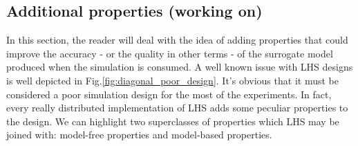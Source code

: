 \documentclass[12pt]{article}
\newcommand{\mfigref}[1]{Fig.\ref{#1}}
\begin{document}
\subsection{Additional properties (working on)}
\label{subsec:lhs_properties}
In this section, the reader will deal with the idea of adding properties that could improve the accuracy - or the quality in other terms - of the surrogate model produced when the simulation is consumed.
A well known issue with LHS designs is well depicted in \mfigref{fig:diagonal_poor_design}. It's obvious that it must be considered a poor simulation design for the most of the experiments. In fact, every really distributed implementation of LHS adds some peculiar properties to the design. We can highlight two superclasses of properties which LHS may be joined with: model-free properties and model-based properties.
\end{document}
